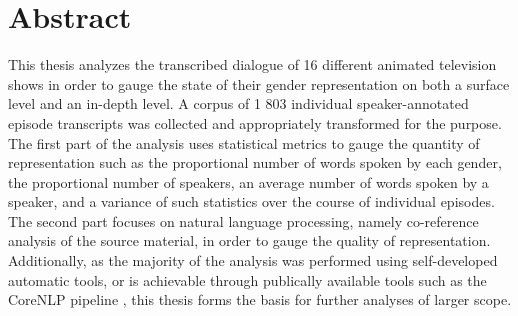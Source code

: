 \documentclass[a4paper, 11pt]{article}
\begin{document}

% 

\newpage
\section*{Abstract}
This thesis analyzes the transcribed dialogue of 16 different animated television shows in order to gauge the state of their gender representation on both a surface level and an in-depth level. A corpus of 1 803 individual speaker-annotated episode transcripts was collected and appropriately transformed for the purpose. The first part of the analysis uses statistical metrics to gauge the quantity of representation such as the proportional number of words spoken by each gender, the proportional number of speakers, an average number of words spoken by a speaker, and a variance of such statistics over the course of individual episodes. The second part focuses on natural language processing, namely co-reference analysis of the source material, in order to gauge the quality of representation. Additionally, as the majority of the analysis was performed using self-developed automatic tools, or is achievable through publically available tools such as the CoreNLP pipeline \citep{manning-EtAl:2014:P14-5}, this thesis forms the basis for further analyses of larger scope.

\newpage
\tableofcontents
\listoftables
\listoffigures
\newpage

\end{document}
